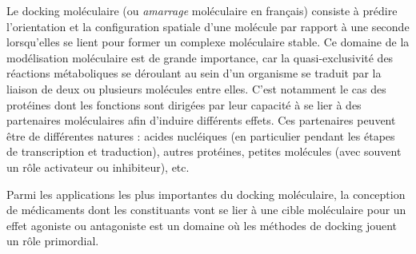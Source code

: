 Le docking moléculaire (ou \textit{amarrage} moléculaire en français) consiste à prédire l'orientation et la configuration spatiale d'une molécule par rapport à une seconde lorsqu’elles se lient pour former un complexe moléculaire stable. Ce domaine de la modélisation moléculaire est de grande importance, car la quasi-exclusivité des réactions métaboliques se déroulant au sein d'un organisme se traduit par la liaison de deux ou plusieurs molécules entre elles. C'est notamment le cas des protéines dont les fonctions sont dirigées par leur capacité à se lier à des partenaires moléculaires afin d'induire différents effets. Ces partenaires peuvent être de différentes natures : acides nucléiques (en particulier pendant les étapes de transcription et traduction), autres protéines, petites molécules (avec souvent un rôle activateur ou inhibiteur), etc.

Parmi les applications les plus importantes du docking moléculaire, la conception de médicaments dont les constituants vont se lier à une cible moléculaire pour un effet agoniste ou antagoniste est un domaine où les méthodes de docking jouent un rôle primordial.

